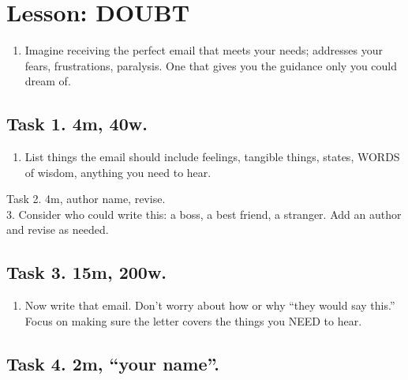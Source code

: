 \documentclass[
]{book}
\providecommand{\tightlist}{%
  \setlength{\itemsep}{0pt}\setlength{\parskip}{0pt}}
\begin{document}
\chapter{Lesson: DOUBT}\label{lesson-doubt}

\begin{enumerate}
\def\labelenumi{\arabic{enumi}.}
\tightlist
\item
  Imagine receiving the perfect email that meets your needs; addresses
  your fears, frustrations, paralysis. One that gives you the guidance
  only you could dream of.
\end{enumerate}

\section{Task 1. 4m, 40w.}\label{task-1.-4m-40w.}

\begin{enumerate}
\def\labelenumi{\arabic{enumi}.}
\setcounter{enumi}{1}
\tightlist
\item
  List things the email should include feelings, tangible things,
  states, WORDS of wisdom, anything you need to hear.
\end{enumerate}

Task 2. 4m, author name, revise.\\
3. Consider who could write this: a boss, a best friend, a stranger. Add
an author and revise as needed.

\section{Task 3. 15m, 200w.}\label{task-3.-15m-200w.}

\begin{enumerate}
\def\labelenumi{\arabic{enumi}.}
\setcounter{enumi}{3}
\tightlist
\item
  Now write that email. Don't worry about how or why ``they would say
  this.'' Focus on making sure the letter covers the things you NEED to
  hear.
\end{enumerate}

\section{Task 4. 2m, ``your name''.}\label{task-4.-2m-your-name.}
\end{document}
